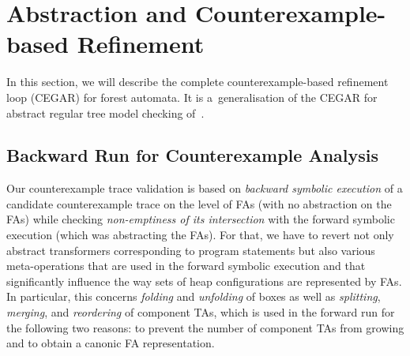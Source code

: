 \section{Abstraction and Counterexample-based Refinement}\label{sec:CEGAR}
In this section, we will describe the complete counterexample-based refinement loop (CEGAR) for forest automata.
It is a~generalisation of the CEGAR for abstract regular tree model checking of~\cite{bhrv06a,bhrv06b}. 


\subsection{Backward Run for Counterexample Analysis}\label{sec:CEXanalysis}

Our counterexample trace validation is based on \emph{backward symbolic execution} of
a candidate counterexample trace on the level of FAs (with no abstraction on the
FAs) while checking \emph{non-emptiness of its intersection} with the forward
symbolic execution (which was abstracting the FAs). For that, we have to revert
not only abstract transformers corresponding to program statements but also
various meta-operations that are used in the forward symbolic execution and that
significantly influence the way sets of heap configurations are represented by
FAs. In particular, this concerns \emph{folding} and \emph{unfolding} of boxes
as well as \emph{splitting}, \emph{merging},
and \emph{reordering} of component TAs, which is used in the forward run for the
following two reasons: to
prevent the number of component TAs from growing and to obtain a canonic
FA representation. 

